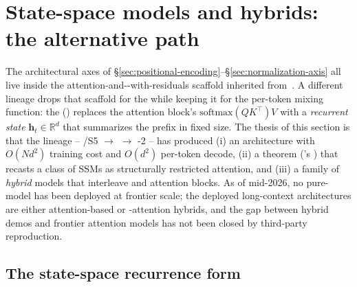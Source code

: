 
\section{State-space models and hybrids: the alternative path}
\label{sec:state-space-and-hybrids}
\label{sec:state-space}

The architectural axes of \S\ref{sec:positional-encoding}--\S\ref{sec:normalization-axis}
all live inside the attention-and--with-residuals scaffold inherited
from~\citet{vaswani2017}. A different lineage drops that scaffold for
the  while keeping it for the per-token mixing function:
the \emph{} () replaces the attention block's
$\mathrm{softmax}(QK^\top)V$ with a \emph{recurrent state}
$\boldsymbol{h}_t \in \mathbb{R}^d$ that summarizes the prefix in fixed
size. The thesis of this section is that the  lineage --
/S5 $\to$  $\to$ -2 -- has produced (i) an architecture with
$O(N d^2)$ training cost and $O(d^2)$ per-token decode, (ii) a theorem
(\citealp{mamba2}'s ) that recasts a class of SSMs
as structurally restricted attention, and (iii) a family of
\emph{hybrid} models that interleave  and attention blocks. As of
mid-2026, no pure- model has been deployed at frontier scale; the
deployed long-context architectures are either attention-based or
-attention hybrids, and the gap between hybrid demos and frontier
attention models has not been closed by third-party reproduction.

\subsection{The state-space recurrence form}
\label{sec:ssm-recurrence}

